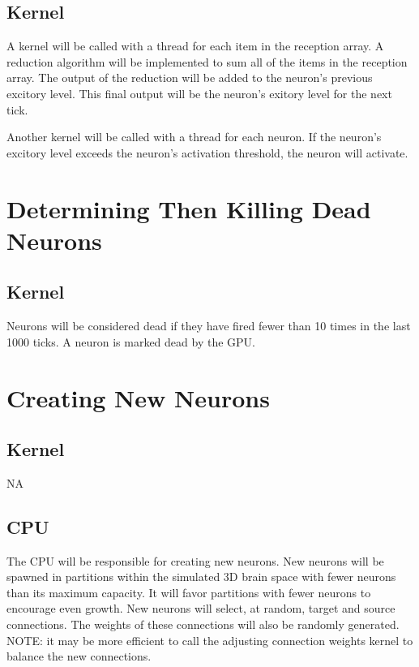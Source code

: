 \documentclass{article} %
\begin{document}
        \subsection{Kernel}
            A kernel will be called with a thread for each item in the reception array. A reduction algorithm will be implemented to sum all of the items in the reception array. The output of the reduction will be added to the neuron's previous excitory level. This final output will be the neuron's exitory level for the next tick.

            Another kernel will be called with a thread for each neuron. If the neuron's excitory level exceeds the neuron's activation threshold, the neuron will activate.
    \section{Determining Then Killing Dead Neurons}
        \subsection{Kernel}
            Neurons will be considered dead if they have fired fewer than 10 times in the last 1000 ticks. A neuron is marked dead by the GPU.
    \section{Creating New Neurons}
        \subsection{Kernel}
            NA
        \subsection{CPU}
            The CPU will be responsible for creating new neurons. New neurons will be spawned in partitions within the simulated 3D brain space with fewer neurons than its maximum capacity. It will favor partitions with fewer neurons to encourage even growth. New neurons will select, at random, target and source connections. The weights of these connections will also be randomly generated. NOTE: it may be more efficient to call the adjusting connection weights kernel to balance the new connections.
\end{document}

